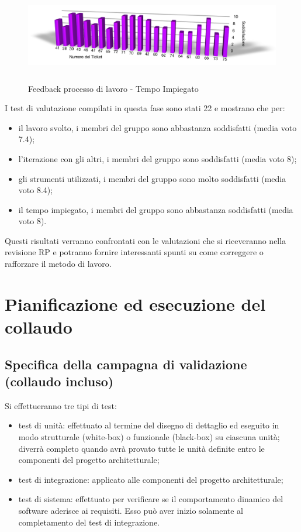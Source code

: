 \begin{figure}[htbp]
  \centering
  \includegraphics[height=4.1cm]{GraficiFeedbackTicket/TempoImpiegato.png}
\caption{Feedback processo di lavoro - Tempo Impiegato}
\end{figure}

\newpage
I test di valutazione compilati in questa fase sono stati 22 e mostrano che
per:
\begin{itemize}
  \item il lavoro svolto, i membri del gruppo sono abbastanza
  soddisfatti (media voto 7.4);
  \item l'iterazione con gli altri, i membri del gruppo sono soddisfatti
  (media voto 8);
  \item gli strumenti utilizzati, i membri del gruppo
  sono molto soddisfatti (media voto 8.4);
  \item il tempo impiegato, i membri del gruppo
  sono abbastanza soddisfatti (media voto 8).\\
\end{itemize}

Questi risultati verranno confrontati con le valutazioni che si riceveranno
nella revisione RP e potranno fornire interessanti spunti su come correggere o
rafforzare il metodo di lavoro.

\chapter{Pianificazione ed esecuzione del \\collaudo}
\thispagestyle{fancy} %

\section{Specifica della campagna di validazione \\(collaudo incluso)}
Si effettueranno tre tipi di test:

\begin{itemize}
	\item test di unit\`a: effettuato al termine del disegno di dettaglio ed eseguito
in modo strutturale (white-box) o funzionale (black-box) su ciascuna unit\`a; diverr\`a completo quando avr\`a provato tutte le unit\`a definite entro le
componenti del progetto architetturale;
	\item test di integrazione: applicato alle componenti del progetto
architetturale;
	\item test di sistema: effettuato per verificare se il comportamento dinamico
del software aderisce ai requisiti. Esso pu\`o aver inizio solamente al
completamento del test di integrazione.
\end{itemize}

